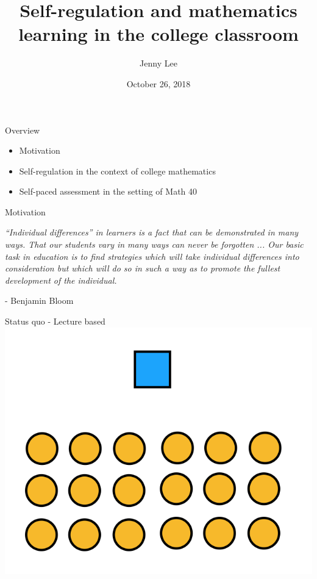 \documentclass{beamer}
\title{Self-regulation and mathematics learning in the college classroom}
\date{October 26, 2018}
\author{Jenny Lee}
\institute{Harvey Mudd College\\Advisor: Dagan Karp}
\begin{document}
\maketitle
\begin{frame}{Overview}

  \begin{itemize}
    \item Motivation
    \item Self-regulation in the context of college mathematics
    \item Self-paced assessment in the setting of Math 40
  \end{itemize}
\end{frame}
\begin{frame}{Motivation}
  \begin{center}
    \textit{``Individual differences'' in learners is a fact that can be demonstrated in many ways. That our students { {\color{blue}}{vary in many ways}} can never be forgotten ... Our basic task in education is to find strategies which will take individual differences into consideration but which will do so in such a way as to { {\color{blue}} promote the fullest development of the individual}.}
  \end{center}
  \hfill- Benjamin Bloom
\end{frame}
\begin{frame}{Status quo - Lecture based}
  \centering
    \includegraphics[scale=0.5]{lecturestyle1}
\end{frame}
\end{document}
